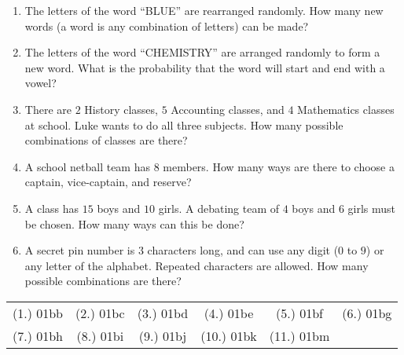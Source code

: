 \begin{eocexercises}{}
\begin{enumerate}
\item The letters of the word ``BLUE'' are rearranged randomly. How many new words (a word is any combination of letters) can be made?

\item The letters of the word ``CHEMISTRY'' are arranged randomly to form a new word. What is the probability that the word will start and end with a vowel?

\item There are $2$ History classes, $5$ Accounting classes, and $4$ Mathematics classes at school. Luke wants to do all three subjects. How many possible combinations of classes are there?

\item A school netball team has $8$ members. How many ways are there to choose a captain, vice-captain, and reserve?

\item A class has $15$ boys and $10$ girls. A debating team of $4$ boys and $6$ girls must be chosen. How many ways can this be done?

\item A secret pin number is $3$ characters long, and can use any digit ($0$ to $9$) or any letter of the alphabet. Repeated characters are allowed. How many possible combinations are there?


\end{enumerate}









\par \practiceinfo
\par \begin{tabular}[h]{cccccc}
(1.)	01bb	&
(2.)	01bc	&
(3.)	01bd	&
(4.)	01be	&
(5.)	01bf	&
(6.)	01bg	\\ %
(7.)	01bh	&
(8.)	01bi	&
(9.)	01bj	&
(10.)	01bk	&
(11.)	01bm	&
\end{tabular}
\end{eocexercises}%
